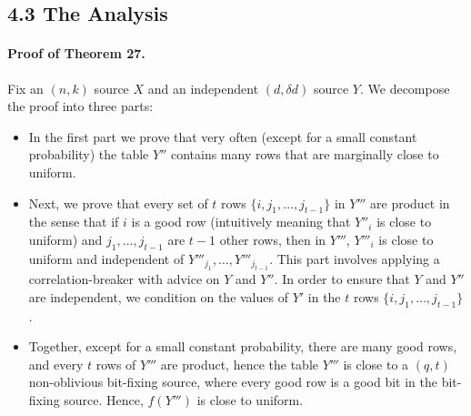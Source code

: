 \documentclass[10pt,a4paper]{article}
\begin{document}
\subsection*{4.3 The Analysis}
\paragraph{Proof of Theorem 27.} Fix an $(n,k)$ source $X$ and an independent $(d,\delta d)$ source $Y$. We decompose the proof into three parts:
\begin{itemize}
\item In the first part we prove that very often (except for a small constant probability) the table $Y''$ contains many rows that are marginally close to uniform.
\item Next, we prove that every set of $t$ rows $\{i,j_1,\ldots,j_{t-1}\}$ in $Y'''$ are product in the sense that if $i$ is a good row (intuitively meaning that $Y''_i$ is close to uniform) and $j_1,\ldots,j_{t-1}$ are $t-1$ other rows, then in $Y'''$, $Y'''_i$ is close to uniform and independent of $Y'''_{j_1},\ldots,Y'''_{j_{t-1}}$. This part involves applying a correlation-breaker with advice on $Y$ and $Y''$. In order to ensure that $Y$ and $Y''$ are independent, we condition on the values of $Y'$ in the $t$ rows $\{i,j_1,\ldots,j_{t-1}\}$.
\item Together, except for a small constant probability, there are many good rows, and every $t$ rows of $Y'''$ are product, hence the table $Y'''$ is close to a $(q,t)$ non-oblivious bit-fixing source, where every good row is a good bit in the bit-fixing source. Hence, $f(Y''')$ is close to uniform.
\end{itemize}
\end{document}
